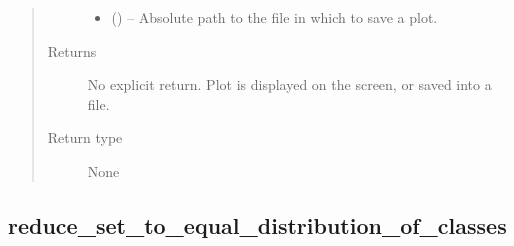 \documentclass[letterpaper,10pt,english]{sphinxmanual}
\begin{document}
\begin{fulllineitems}
\begin{quote}
\begin{description}
\begin{itemize}
\item {} 
 () -- Absolute path to the file in which to save a plot.

\end{itemize}

\item[{Returns}] \leavevmode
No explicit return. Plot is displayed on the screen, or saved
into a file.

\item[{Return type}] \leavevmode
None

\end{description}\end{quote}

\end{fulllineitems}



\subsection{reduce\_set\_to\_equal\_distribution\_of\_classes}
\label{\detokenize{api/ucf.reduce_set_to_equal_distribution_of_classes:reduce-set-to-equal-distribution-of-classes}}\label{\detokenize{api/ucf.reduce_set_to_equal_distribution_of_classes::doc}}
\end{document}
